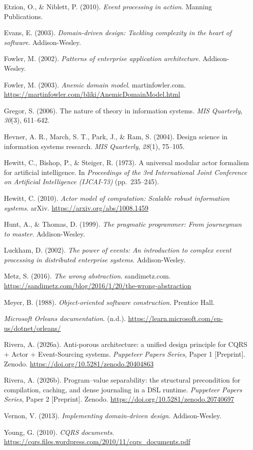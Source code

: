 \documentclass[
]{article}
\begin{document}
Etzion, O., \& Niblett, P. (2010). \emph{Event processing in action}.
Manning Publications.

Evans, E. (2003). \emph{Domain-driven design: Tackling complexity in the
heart of software}. Addison-Wesley.

Fowler, M. (2002). \emph{Patterns of enterprise application
architecture}. Addison-Wesley.

Fowler, M. (2003). \emph{Anemic domain model}. martinfowler.com.
\url{https://martinfowler.com/bliki/AnemicDomainModel.html}

Gregor, S. (2006). The nature of theory in information systems.
\emph{MIS Quarterly}, \emph{30}(3), 611--642.

Hevner, A. R., March, S. T., Park, J., \& Ram, S. (2004). Design science
in information systems research. \emph{MIS Quarterly}, \emph{28}(1),
75--105.

Hewitt, C., Bishop, P., \& Steiger, R. (1973). A universal modular actor
formalism for artificial intelligence. In \emph{Proceedings of the 3rd
International Joint Conference on Artificial Intelligence (IJCAI-73)}
(pp.~235--245).

Hewitt, C. (2010). \emph{Actor model of computation: Scalable robust
information systems}. arXiv. \url{https://arxiv.org/abs/1008.1459}

Hunt, A., \& Thomas, D. (1999). \emph{The pragmatic programmer: From
journeyman to master}. Addison-Wesley.

Luckham, D. (2002). \emph{The power of events: An introduction to
complex event processing in distributed enterprise systems}.
Addison-Wesley.

Metz, S. (2016). \emph{The wrong abstraction}. sandimetz.com.
\url{https://sandimetz.com/blog/2016/1/20/the-wrong-abstraction}

Meyer, B. (1988). \emph{Object-oriented software construction}. Prentice
Hall.

\emph{Microsoft Orleans documentation}. (n.d.).
\url{https://learn.microsoft.com/en-us/dotnet/orleans/}

Rivera, A. (2026a). Anti-porous architecture: a unified design principle
for CQRS + Actor + Event-Sourcing systems. \emph{Puppeteer Papers
Series}, Paper 1 {[}Preprint{]}. Zenodo.
\url{https://doi.org/10.5281/zenodo.20404863}

Rivera, A. (2026b). Program--value separability: the structural
precondition for compilation, caching, and dense journaling in a DSL
runtime. \emph{Puppeteer Papers Series}, Paper 2 {[}Preprint{]}. Zenodo.
\url{https://doi.org/10.5281/zenodo.20740697}

Vernon, V. (2013). \emph{Implementing domain-driven design}.
Addison-Wesley.

Young, G. (2010). \emph{CQRS documents}.
\url{https://cqrs.files.wordpress.com/2010/11/cqrs_documents.pdf}
\end{document}

